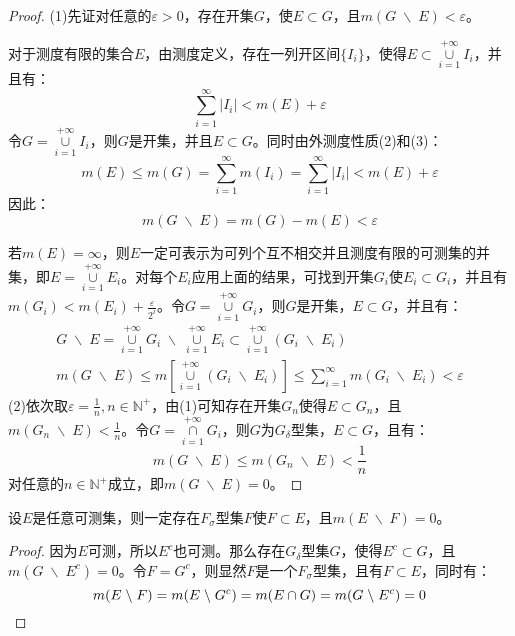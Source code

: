 \begin{proof}
	(1)先证对任意的$\varepsilon>0$，存在开集$G$，使$E\subset G$，且$m(G\;\backslash\; E)<\varepsilon$。\par
	对于测度有限的集合$E$，由测度定义，存在一列开区间$\{I_i\}$，使得$E\subset\underset{i=1}{\overset{+\infty}{\cup}}I_i$，并且有：
	\begin{equation*}
		\sum_{i=1}^\infty|I_i|<m(E)+\varepsilon
	\end{equation*}
	令$G=\underset{i=1}{\overset{+\infty}{\cup}}I_i$，则$G$是开集，并且$E\subset G$。同时由外测度性质(2)和(3)：
	\begin{equation*}
		m(E)\leqslant m(G)=\sum_{i=1}^\infty m(I_i)=\sum_{i=1}^\infty|I_i|<m(E)+\varepsilon
	\end{equation*}
	因此：
	\begin{equation*}
		m(G\;\backslash\; E)=m(G)-m(E)<\varepsilon
	\end{equation*}
	\par 若$m(E)=\infty$，则$E$一定可表示为可列个互不相交并且测度有限的可测集的并集，即$E=\underset{i=1}{\overset{+\infty}{\cup}}E_i$。对每个$E_i$应用上面的结果，可找到开集$G_i$使$E_i\subset G_i$，并且有$m(G_i)<m(E_i)+\frac{\varepsilon}{2^i}$。令$G=\underset{i=1}{\overset{+\infty}{\cup}}G_i$，则$G$是开集，$E\subset G$，并且有：
	\begin{gather*}
		G\;\backslash\; E=\underset{i=1}{\overset{+\infty}{\cup}}G_i\;\backslash\;\underset{i=1}{\overset{+\infty}{\cup}}E_i\subset \underset{i=1}{\overset{+\infty}{\cup}}(G_i\;\backslash\; E_i) \\
		m(G\;\backslash\; E)\leqslant m\left[\underset{i=1}{\overset{+\infty}{\cup}}(G_i\;\backslash\; E_i)\right]\leqslant\sum_{i=1}^\infty m(G_i\;\backslash\; E_i)<\varepsilon
	\end{gather*}
	(2)依次取$\varepsilon=\frac{1}{n},n\in\mathbb{N}^+$，由(1)可知存在开集$G_n$使得$E\subset G_n$，且$m(G_n\;\backslash\; E)<\frac{1}{n}$。令$G=\underset{i=1}{\overset{+\infty}{\cap}}G_i$，则$G$为$G_\delta$型集，$E\subset G$，且有：
	\begin{equation*}
		m(G\;\backslash\; E)\leqslant m(G_n\;\backslash\; E)<\frac{1}{n}
	\end{equation*}
	对任意的$n\in\mathbb{N}^+$成立，即$m(G\;\backslash\; E)=0$。
\end{proof}
\begin{theorem}
	设$E$是任意可测集，则一定存在$F_\sigma$型集$F$使$F\subset E$，且$m(E\;\backslash\; F)=0$。
\end{theorem}
\begin{proof}
	因为$E$可测，所以$E^c$也可测。那么存在$G_\delta$型集$G$，使得$E^c\subset G$，且$m(G\;\backslash\;E^c)=0$。令$F=G^c$，则显然$F$是一个$F_\sigma$型集，且有$F\subset E$，同时有：
	\begin{equation*}
		m(E\;\backslash\;F)=m(E\;\backslash\;G^c)=m(E\cap G)=m(G\;\backslash\;E^c)=0\qedhere
	\end{equation*}
\end{proof}

